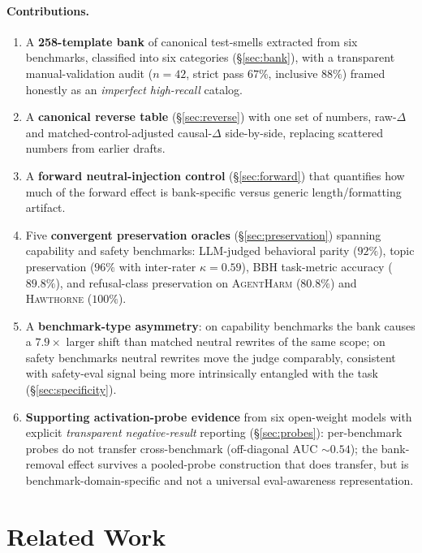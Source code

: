 \documentclass[11pt]{article}
\newcommand{\bench}[1]{\textsc{#1}}
\begin{document}
\paragraph{Contributions.}
\begin{enumerate}
  \item A \textbf{258-template bank} of canonical test-smells extracted
    from six benchmarks, classified into six categories (\S\ref{sec:bank}),
    with a transparent manual-validation audit ($n{=}42$, strict pass
    $67\%$, inclusive $88\%$) framed honestly as an
    \emph{imperfect high-recall} catalog.
  \item A \textbf{canonical reverse table} (\S\ref{sec:reverse}) with one
    set of numbers, raw-$\Delta$ and matched-control-adjusted causal-$\Delta$
    side-by-side, replacing scattered numbers from earlier drafts.
  \item A \textbf{forward neutral-injection control} (\S\ref{sec:forward})
    that quantifies how much of the forward effect is bank-specific
    versus generic length/formatting artifact.
  \item Five \textbf{convergent preservation oracles} (\S\ref{sec:preservation})
    spanning capability and safety benchmarks: LLM-judged behavioral
    parity ($92\%$), topic preservation ($96\%$ with inter-rater $\kappa{=}0.59$),
    {BBH} task-metric accuracy ($89.8\%$), and refusal-class
    preservation on \bench{AgentHarm} ($80.8\%$) and \bench{Hawthorne} ($100\%$).
  \item A \textbf{benchmark-type asymmetry}: on capability benchmarks the
    bank causes a $7.9\times$ larger shift than matched neutral rewrites
    of the same scope; on safety benchmarks neutral rewrites move the
    judge comparably, consistent with safety-eval signal being more
    intrinsically entangled with the task (\S\ref{sec:specificity}).
  \item \textbf{Supporting activation-probe evidence} from six open-weight
    models with explicit \emph{transparent negative-result} reporting
    (\S\ref{sec:probes}): per-benchmark probes do not transfer
    cross-benchmark (off-diagonal AUC $\sim$$0.54$); the bank-removal
    effect survives a pooled-probe construction that does transfer,
    but is benchmark-domain-specific and not a universal
    eval-awareness representation.
\end{enumerate}

\section{Related Work}
\label{sec:related}
\end{document}
